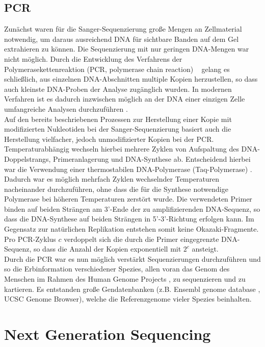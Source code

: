 \subsection{PCR}  \label{subsec:pcr}

Zunächst waren für die Sanger-Sequenzierung große Mengen an Zellmaterial notwendig, um daraus ausreichend DNA für sichtbare Banden auf dem Gel extrahieren zu können. Die Sequenzierung mit nur geringen DNA-Mengen war nicht möglich. Durch die Entwicklung des Verfahrens der Polymerasekettenreaktion (PCR, polymerase chain reaction) ~\cite{mullis_1986} gelang es schließlich, aus einzelnen DNA-Abschnitten multiple Kopien herzustellen, so dass auch kleinste DNA-Proben der Analyse zugänglich wurden. In modernen Verfahren ist es dadurch inzwischen möglich an der DNA einer einzigen Zelle umfangreiche Analysen durchzuführen \cite{gawad_2016}. \\

Auf den bereits beschriebenen Prozessen zur Herstellung einer Kopie mit modifizierten Nukleotiden bei der Sanger-Sequenzierung basiert auch die Herstellung vielfacher, jedoch unmodifizierter Kopien bei der PCR. Temperaturabhängig wechseln hierbei mehrere Zyklen von Aufspaltung des DNA-Doppelstrangs, Primeranlagerung und DNA-Synthese ab. Entscheidend hierbei war die Verwendung einer thermostabilen DNA-Polymerase (Taq-Polymerase) \cite{green_2019}. Dadurch war es möglich mehrfach Zyklen wechselnder Temperaturen nacheinander durchzuführen, ohne dass die für die Synthese notwendige Polymerase bei höheren Temperaturen zerstört wurde. Die verwendeten Primer binden auf beiden Strängen am 3'-Ende der zu amplifizierenden DNA-Sequenz, so dass die DNA-Synthese auf beiden Strängen in 5'-3'-Richtung erfolgen kann. Im Gegensatz zur natürlichen Replikation entstehen somit keine Okazaki-Fragmente. Pro PCR-Zyklus $c$ verdoppelt sich die durch die Primer eingegrenzte DNA-Sequenz, so dass die Anzahl der Kopien exponentiell mit $2^c$ ansteigt. \\

Durch die PCR war es nun möglich verstärkt Sequenzierungen durchzuführen und so die  Erbinformation verschiedener Spezies, allen voran das Genom des Menschen im Rahmen des Human Genome Projects \cite{mcpherson_2001}, zu sequenzieren und zu kartieren. Es entstanden große Gendatenbanken (z.B. Ensembl genome database \cite{flicek_2008}, UCSC Genome Browser), welche die Referenzgenome vieler Spezies beinhalten.

\section{Next Generation Sequencing} \label{subsec:ngs}

